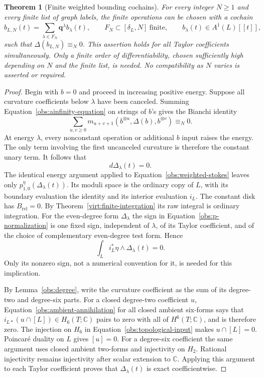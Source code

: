 \documentclass[11pt]{article}
\newtheorem{theorem}{Theorem}[section]
\theoremstyle{definition}
\theoremstyle{remark}
\newcommand{\C}{\mathbb C}
\newcommand{\qnov}{\mathbf q}
\numberwithin{equation}{section}
\begin{document}
\begin{theorem}[Finite weighted bounding cochains]
\label{obs:finite-bounding}
For every integer $N\ge1$ and every finite list of graph labels, the
finite operations can be chosen with a cochain
\[
 b_{L,N}(t)=\sum_{\lambda\in F_N}\qnov^\lambda b_\lambda(t),
 \qquad F_N\subset[\delta_L,N]\ \text{finite},\qquad
 b_\lambda(t)\in A^{\bar1}(L)[[t]],
\]
such that $\Delta(b_{L,N})\equiv_N0$.
This assertion holds for all
Taylor coefficients simultaneously.  Only a finite order of
differentiability, chosen sufficiently high depending on $N$
and the finite list, is needed.  No compatibility as $N$
varies is asserted or required.
\end{theorem}

\begin{proof}
Begin with $b=0$ and proceed in increasing positive energy.
Suppose all curvature coefficients below $\lambda$ have
been canceled.  Summing
Equation~\eqref{obs:ainfinity-equation} on strings of $b$'s
gives the Bianchi identity
\[
 \sum_{u,v\ge0}m_{u+v+1}(b^{\otimes u},\Delta(b),
                              b^{\otimes v})\equiv_N0.
\]
At energy $\lambda$, every nonconstant operation or additional
$b$ input raises the energy.  The only term involving the
first uncanceled curvature is therefore the constant unary
term.  It follows that
\begin{equation}
 \label{obs:closed-obstruction}
 d\Delta_\lambda(t)=0.
\end{equation}
The identical energy argument applied to
Equation~\eqref{obs:weighted-stokes} leaves only
$p_{1,0}^\eta(\Delta_\lambda(t))$.  Its moduli space is the
ordinary copy of $L$, with its boundary evaluation the
identity and its interior evaluation $i_L$.
The constant disk has $B_{\mathrm{rel}}=0$.
By Theorem~\ref{virt:finite-integration} its raw integral is
ordinary integration.  For the even-degree form
$\Delta_\lambda$ the sign in
Equation~\eqref{obs:p-normalization} is one fixed sign,
independent of $\lambda$, of its Taylor coefficient, and of
the choice of complementary even-degree test form.  Hence
\begin{equation}
 \label{obs:ambient-annihilation}
 \int_Li_L^*\eta\wedge\Delta_\lambda(t)=0.
\end{equation}
Only its nonzero sign, not a numerical convention for it, is
needed for this implication.

By Lemma~\ref{obs:degree}, write the curvature coefficient as
the sum of its degree-two and degree-six parts.
For a closed degree-two coefficient $u$, Equation~\eqref{obs:ambient-annihilation}
for all closed ambient six-forms says that
$i_{L*}(u\cap[L])\in H_6(T;\C)$ pairs to zero with all of
$H^6(T;\C)$, and is therefore zero.  The injection on $H_6$
in Equation~\eqref{obs:topological-input} makes $u\cap[L]=0$.
Poincar\'e duality on
$L$ gives $[u]=0$.  For a degree-six coefficient the same
argument uses closed ambient two-forms and injectivity on
$H_2$.  Rational injectivity remains injectivity after scalar
extension to $\C$.  Applying this argument to each Taylor
coefficient proves that $\Delta_\lambda(t)$ is exact
coefficientwise.


\end{proof}
\end{document}
